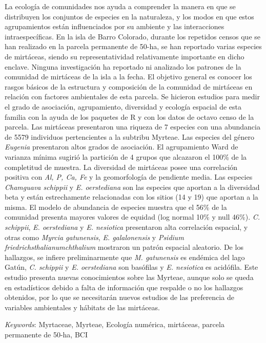\documentclass[11pt,]{article}
\renewenvironment{abstract}
 {{%
    \setlength{\leftmargin}{0mm}
    \setlength{\rightmargin}{\leftmargin}%
  }%
  \relax}
 {\endlist}
\begin{document}
\begin{abstract}

    \hbox{\vrule height .2pt width 39.14pc}

    \vskip 8.5pt %

\noindent La ecología de comunidades nos ayuda a comprender la manera en que se
distribuyen los conjuntos de especies en la naturaleza, y los modos en
que estos agrupamientos están influenciados por su ambiente y las
interacciones intraespecíficas. En la isla de Barro Colorado, durante
los repetidos censos que se han realizado en la parcela permanente de
50-ha, se han reportado varias especies de mirtáceas, siendo su
representatividad relativamente importante en dicho enclave. Ninguna
investigación ha reportado ni analizado los patrones de la comunidad de
mirtáceas de la isla a la fecha. El objetivo general es conocer los
rasgos básicos de la estructura y composición de la comunidad de
mirtáceas en relación con factores ambientales de esta parcela. Se
hicieron estudios para medir el grado de asociación, agrupamiento,
diversidad y ecología espacial de esta familia con la ayuda de los
paquetes de R y con los datos de octavo censo de la parcela. Las
mirtáceas presentaron una riqueza de 7 especies con una abundancia de
5579 individuos pertencientes a la subtribu Myrteae. Las especies del
género \emph{Eugenia} presentaron altos grados de asociación. El
agrupamiento Ward de varianza mínima sugirió la partición de 4 grupos
que alcazaron el 100\% de la completitud de muestra. La diversidad de
mirtáceas posee una correlación positiva con \emph{Al, P, Ca, Fe} y la
geomorfología de pendiente media. Las especies \emph{Chamguava schippii}
y \emph{E. oerstediana} son las especies que aportan a la diversidad
beta y están estrechamente relacionadas con los sitios (14 y 19) que
aportan a la misma. El modelo de abundancia de especies muestra que el
56\% de la comunidad presenta mayores valores de equidad (log normal
10\% y null 46\%). \emph{C. schippii}, \emph{E. oerstediana} y \emph{E.
nesiotica} presentaron alta correlación espacial, y otras como
\emph{Myrcia gatunensis}, \emph{E. galalonensis} y \emph{Psidium
friedrichsthalianumchthalium} mostraron un patrón espacial aleatorio. De
los hallazgos, se infiere preliminarmente que \emph{M. gatunensis} es
endémica del lago Gatún, \emph{C. schippii} y \emph{E. oerstediana} son
basófilas y \emph{E. nesiotica} es acidófila. Este estudio presenta
nuevas conocimientos sobre las Myrteae, aunque solo se queda en
estadísticos debido a falta de información que respalde o no los
hallazgos obtenidos, por lo que se necesitarán nuevos estudios de las
preferencia de variables ambientales y hábitats de las mirtáceas.


\vskip 8.5pt \noindent \emph{Keywords}: Myrtaceae, Myrteae, Ecología numérica, mirtáceas, parcela permanente de
50-ha, BCI \par

    \hbox{\vrule height .2pt width 39.14pc}



\end{abstract}
\end{document}
